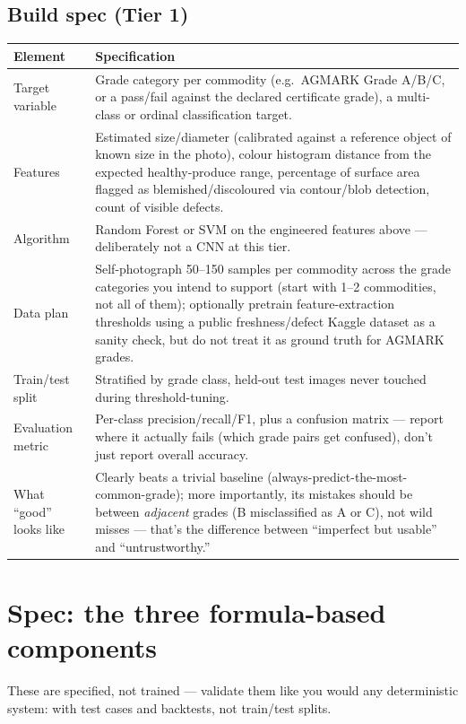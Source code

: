 \documentclass[11pt]{article}
\begin{document}
\subsection*{Build spec (Tier 1)}
\renewcommand{\arraystretch}{1.3}
\noindent\begin{longtable}{@{}p{3.0cm}p{9.5cm}@{}}
\toprule
\textbf{Element} & \textbf{Specification} \\
\midrule
\endhead
Target variable & Grade category per commodity (e.g.\ AGMARK Grade A/B/C, or a pass/fail against the
declared certificate grade), a multi-class or ordinal classification target. \\[0.3em]
Features & Estimated size/diameter (calibrated against a reference object of known size in the photo),
colour histogram distance from the expected healthy-produce range, percentage of surface area flagged as
blemished/discoloured via contour/blob detection, count of visible defects. \\[0.3em]
Algorithm & Random Forest or SVM on the engineered features above --- deliberately not a CNN at this tier. \\[0.3em]
Data plan & Self-photograph 50--150 samples per commodity across the grade categories you intend to
support (start with 1--2 commodities, not all of them); optionally pretrain feature-extraction thresholds
using a public freshness/defect Kaggle dataset as a sanity check, but do not treat it as ground truth for
AGMARK grades. \\[0.3em]
Train/test split & Stratified by grade class, held-out test images never touched during threshold-tuning. \\[0.3em]
Evaluation metric & Per-class precision/recall/F1, plus a confusion matrix --- report where it actually
fails (which grade pairs get confused), don't just report overall accuracy. \\[0.3em]
What ``good'' looks like & Clearly beats a trivial baseline (always-predict-the-most-common-grade); more
importantly, its mistakes should be between \emph{adjacent} grades (B misclassified as A or C), not wild
misses --- that's the difference between ``imperfect but usable'' and ``untrustworthy.'' \\
\bottomrule
\end{longtable}

\clearpage
\section{Spec: the three formula-based components}
These are specified, not trained --- validate them like you would any deterministic system: with test
cases and backtests, not train/test splits.
\end{document}
